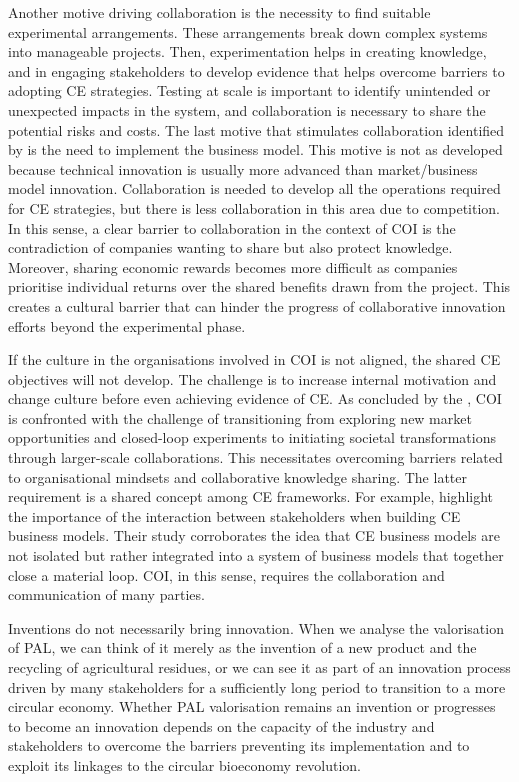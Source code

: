 Another motive driving collaboration is the necessity to find suitable experimental arrangements. These arrangements break down complex systems into manageable projects. Then, experimentation helps in creating knowledge, and in engaging stakeholders to develop evidence that helps overcome barriers to adopting CE strategies. Testing at scale is important to identify unintended or unexpected impacts in the system, and collaboration is necessary to share the potential risks and costs. The last motive that stimulates collaboration identified by \citeauthor{brown2019companies} is the need to implement the business model. This motive is not as developed because technical innovation is usually more advanced than market/business model innovation. Collaboration is needed to develop all the operations required for CE strategies, but there is less collaboration in this area due to competition. In this sense, a clear barrier to collaboration in the context of COI is the contradiction of companies wanting to share but also protect knowledge. Moreover, sharing economic rewards becomes more difficult as companies prioritise individual returns over the shared benefits drawn from the project. This creates a cultural barrier that can hinder the progress of collaborative innovation efforts beyond the experimental phase. 

If the culture in the organisations involved in COI is not aligned, the shared CE objectives will not develop. The challenge is to increase internal motivation and change culture before even achieving evidence of CE. As concluded by the \citeauthor{brown2019companies}, COI is confronted with the challenge of transitioning from exploring new market opportunities and closed-loop experiments to initiating societal transformations through larger-scale collaborations. This necessitates overcoming barriers related to organisational mindsets and collaborative knowledge sharing. The latter requirement is a shared concept among CE frameworks. For example, \cite{antikainen2016framework} highlight the importance of the interaction between stakeholders when building CE business models. Their study corroborates the idea that CE business models are not isolated but rather integrated into a system of business models that together close a material loop. COI, in this sense, requires the collaboration and communication of many parties.

Inventions do not necessarily bring innovation. When we analyse the valorisation of PAL, we can think of it merely as the invention of a new product and the recycling of agricultural residues, or we can see it as part of an innovation process driven by many stakeholders for a sufficiently long period to transition to a more circular economy. Whether PAL valorisation remains an invention or progresses to become an innovation depends on the capacity of the industry and stakeholders to overcome the barriers preventing its implementation and to exploit its linkages to the circular bioeconomy revolution.

